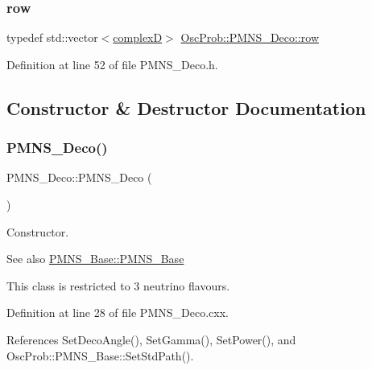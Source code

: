 \subsubsection{\texorpdfstring{row}{row}}
{\footnotesize\ttfamily typedef std\+::vector$<$\hyperlink{EigenPoint_8h_a67ca8e107e20610c3fff78d5e726ece0}{complexD}$>$ \hyperlink{classOscProb_1_1PMNS__Deco_a430859c3da89582de577f8f7e75f2d16}{Osc\+Prob\+::\+P\+M\+N\+S\+\_\+\+Deco\+::row}}



Definition at line 52 of file P\+M\+N\+S\+\_\+\+Deco.\+h.



\subsection{Constructor \& Destructor Documentation}
\mbox{\label{classOscProb_1_1PMNS__Deco_a976dc43bb65547af5f4a27f5a8fccbba}} 
\subsubsection{\texorpdfstring{P\+M\+N\+S\+\_\+\+Deco()}{PMNS\_Deco()}}
{\footnotesize\ttfamily P\+M\+N\+S\+\_\+\+Deco\+::\+P\+M\+N\+S\+\_\+\+Deco (\begin{DoxyParamCaption}{ }\end{DoxyParamCaption})}

Constructor. \begin{DoxySeeAlso}{See also}
\hyperlink{classOscProb_1_1PMNS__Base_aa53e83b03a9cf4bdfa0a07136bd17a79}{P\+M\+N\+S\+\_\+\+Base\+::\+P\+M\+N\+S\+\_\+\+Base}
\end{DoxySeeAlso}
This class is restricted to 3 neutrino flavours. 

Definition at line 28 of file P\+M\+N\+S\+\_\+\+Deco.\+cxx.



References Set\+Deco\+Angle(), Set\+Gamma(), Set\+Power(), and Osc\+Prob\+::\+P\+M\+N\+S\+\_\+\+Base\+::\+Set\+Std\+Path().


